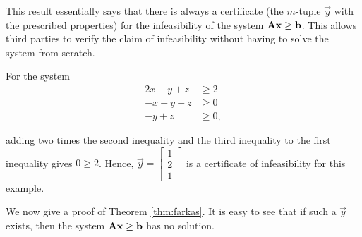 This result essentially says that there is always a certificate (the
\(m\)-tuple \(\vec{y}\) with the prescribed properties) for the
infeasibility of the system \(\mathbf{A}\mathbf{x} \geq \mathbf{b}\). This allows
third parties to verify the claim of infeasibility without having to
solve the system from scratch.

\begin{example}{}{}
\protect\hypertarget{ex:unnamed-chunk-2}{}{\label{ex:unnamed-chunk-2}} For
the system
\begin{align*}
2x - y + z & \geq 2 \\
-x + y - z & \geq 0 \\
   - y + z & \geq 0,
\end{align*}

adding two times the second inequality and the third inequality to the
first inequality gives \(0 \geq 2\). Hence,
\(\vec{y} = \begin{bmatrix} 1\\ 2 \\ 1\end{bmatrix}\) is a certificate
of infeasibility for this example.
\end{example}

We now give a proof of Theorem \ref{thm:farkas}. It is easy to see that
if such a \(\vec{y}\) exists, then the system
\(\mathbf{A}\mathbf{x} \geq \mathbf{b}\) has no solution.

